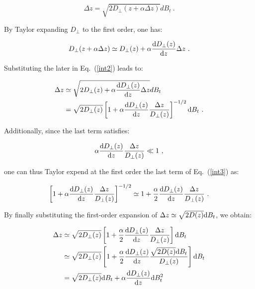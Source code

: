 \begin{equation}
	\Delta z  = \sqrt{2D_\bot (z + \alpha \Delta z)} d B_t ~.
	\label{int2}
\end{equation}

By Taylor expanding $D_ \bot$ to the first order, one has:

\begin{equation}
	D_\bot (z + \alpha \Delta z) \simeq D_\bot (z)  + \alpha \frac{\textnormal{d} D_\bot(z)}{\textnormal{d}z} \Delta z ~.
\end{equation}

Substituting the later in Eq.~(\ref{int2}) leads to:

\begin{equation}
	\begin{aligned}
		\Delta z &\simeq \sqrt{2D_\bot (z)  + \alpha \frac{\textnormal{d} D_\bot(z)}{\textnormal{d}z} \Delta z} d B_t  \\
		& = \sqrt{2D_\bot (z)} \left[1 + \alpha \frac{\textnormal{d} D_\bot(z)}{\textnormal{d}z} \frac{\Delta z }{D_\bot(z)}\right] ^{-1/2} \textnormal{d} B_t  ~.
	\end{aligned}
	\label{int3}
\end{equation}

Additionally, since the last term satisfies:

\begin{equation}
	\alpha \frac{\textnormal{d} D_\bot(z)}{\textnormal{d}z} \frac{\Delta z }{D_\bot(z)} \ll 1 ~,
\end{equation}

one can thus Taylor expend at the first order the last term of Eq.~(\ref{int3}) as:

\begin{equation}
	\left[1 + \alpha \frac{\textnormal{d} D_\bot(z)}{\textnormal{d}z} \frac{\Delta z }{D_\bot(z)}\right] ^{-1/2} \simeq 1 + \frac{\alpha }{2}\frac{\textnormal{d} D_\bot(z)}{\textnormal{d}z} \frac{\Delta z }{D_\bot(z)} ~.
\end{equation}

By finally substituting the first-order expansion of $\Delta z \simeq \sqrt{2D(z)} \textnormal{d}B_t$, we obtain:

\begin{equation}
	\begin{aligned}
		\Delta z & \simeq \sqrt{2D_\bot (z)} \left[1 + \frac{\alpha }{2} \frac{\textnormal{d} D_\bot(z)}{\textnormal{d}z} \frac{\Delta z }{D_\bot(z)}\right]  \textnormal{d} B_t \\
		& \simeq \sqrt{2D_\bot (z)} \left[1 + \frac{\alpha }{2} \frac{\textnormal{d} D_\bot(z)}{\textnormal{d}z} \frac{\sqrt{2D(z)} \textnormal{d}B_t }{D_\bot(z)}\right]  \textnormal{d} B_t \\
		& =  \sqrt{2D_\bot (z)} \textnormal{d}B_t + \alpha  \frac{\textnormal{d} D_\bot(z)}{\textnormal{d}z} \textnormal{d} B_t ^2
	\end{aligned}
\end{equation}




